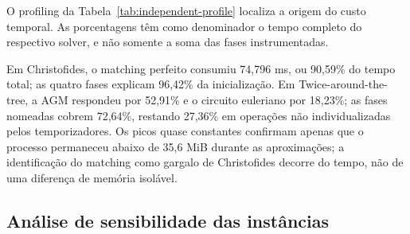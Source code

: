 \documentclass[12pt]{article}
\begin{document}
O profiling da Tabela~\ref{tab:independent-profile} localiza a origem do custo
temporal. As porcentagens têm como denominador o tempo completo do respectivo
solver, e não somente a soma das fases instrumentadas.

\begin{table}[H]
  \centering
  \caption{Profiling dos solvers aproximativos no painel balanceado. A
  memória é o pico residente do processo observado ao fim da fase, não uma
  alocação exclusiva da subrotina.}
  \label{tab:independent-profile}
  \scriptsize
\end{table}

Em Christofides, o matching perfeito consumiu 74,796 ms, ou 90,59\% do tempo
total; as quatro fases explicam 96,42\% da inicialização. Em
Twice-around-the-tree, a AGM respondeu por 52,91\% e o circuito euleriano por
18,23\%; as fases nomeadas cobrem 72,64\%, restando 27,36\% em operações não
individualizadas pelos temporizadores. Os picos quase constantes confirmam
apenas que o processo permaneceu abaixo de 35,6 MiB durante as aproximações; a
identificação do matching como gargalo de Christofides decorre do tempo, não de
uma diferença de memória isolável.

\subsection{Análise de sensibilidade das instâncias}
\end{document}
